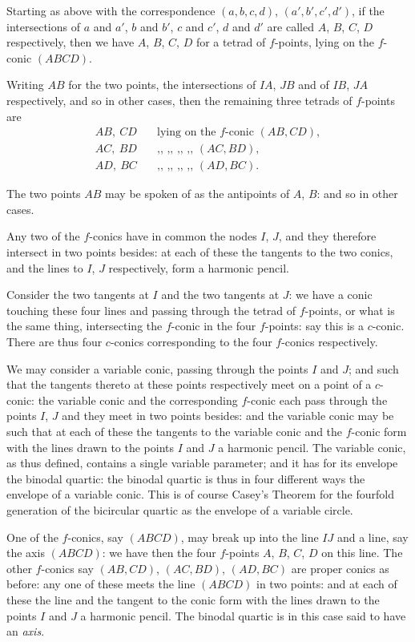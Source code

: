 \documentclass[11pt,a4paper]{article}
\begin{document}
Starting as above with the correspondence $(a, b, c, d)$, $(a', b', c', d')$, if the intersections of $a$ and $a'$, $b$ and $b'$, $c$ and $c'$, $d$ and $d'$ are called $A$, $B$, $C$, $D$ respectively, then we have $A$, $B$, $C$, $D$ for a tetrad of $f$-points, lying on the $f$-conic $(ABCD)$.

Writing $AB$ for the two points, the intersections of $IA$, $JB$ and of $IB$, $JA$ respectively, and so in other cases, then the remaining three tetrads of $f$-points are
\begin{align*}
AB,\ CD &\quad\text{lying on the $f$-conic } (AB, CD), \\
AC,\ BD &\quad\text{,, ,, ,, ,, } (AC, BD), \\
AD,\ BC &\quad\text{,, ,, ,, ,, } (AD, BC).
\end{align*}

The two points $AB$ may be spoken of as the antipoints of $A$, $B$: and so in other cases.

Any two of the $f$-conics have in common the nodes $I$, $J$, and they therefore intersect in two points besides: at each of these the tangents to the two conics, and the lines to $I$, $J$ respectively, form a harmonic pencil.

Consider the two tangents at $I$ and the two tangents at $J$: we have a conic touching these four lines and passing through the tetrad of $f$-points, or what is the same thing, intersecting the $f$-conic in the four $f$-points: say this is a $c$-conic. There are thus four $c$-conics corresponding to the four $f$-conics respectively.

We may consider a variable conic, passing through the points $I$ and $J$; and such that the tangents thereto at these points respectively meet on a point of a $c$-conic: the variable conic and the corresponding $f$-conic each pass through the points $I$, $J$ and they meet in two points besides: and the variable conic may be such that at each of these the tangents to the variable conic and the $f$-conic form with the lines drawn to the points $I$ and $J$ a harmonic pencil. The variable conic, as thus defined, contains a single variable parameter; and it has for its envelope the binodal quartic: the binodal quartic is thus in four different ways the envelope of a variable conic. This is of course Casey's Theorem for the fourfold generation of the bicircular quartic as the envelope of a variable circle.

One of the $f$-conics, say $(ABCD)$, may break up into the line $IJ$ and a line, say the axis $(ABCD)$: we have then the four $f$-points $A$, $B$, $C$, $D$ on this line. The other $f$-conics say $(AB, CD)$, $(AC, BD)$, $(AD, BC)$ are proper conics as before: any one of these meets the line $(ABCD)$ in two points: and at each of these the line and the tangent to the conic form with the lines drawn to the points $I$ and $J$ a harmonic pencil. The binodal quartic is in this case said to have an \emph{axis}.
\end{document}

